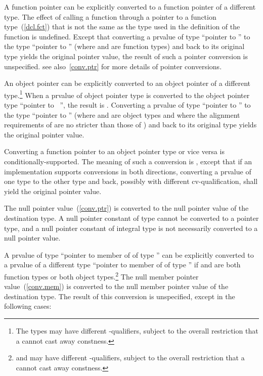 \pnum
{}%
%
%
A function pointer can be explicitly converted
to a function pointer of a different type.
%
The effect of calling a function through a pointer to a function
type~(\ref{dcl.fct}) that is not the same as the type used in the
definition of the function is undefined. Except that converting
a prvalue of type ``pointer to '' to the type ``pointer to
'' (where  and  are function types) and
back to its original type yields the original pointer value, the result
of such a pointer conversion is unspecified.
\enternote 
see also~\ref{conv.ptr} for more details of pointer conversions.
\exitnote 

\pnum
An object pointer
can be explicitly converted to an object pointer of a different type.\footnote{The
types may have different \cv-qualifiers, subject to
the overall
restriction that a  cannot cast away constness.}
When a prvalue  of object pointer type is converted to
the object pointer type ``pointer to \cv\ '', the result is .
Converting a prvalue of type ``pointer to '' to
the type ``pointer to '' (where  and  are
object types and where the alignment requirements of \tcode{T2} are no
stricter than those of \tcode{T1}) and back to its original type yields
the original pointer value.

\pnum
Converting a function pointer to an object pointer
type or vice versa is
conditionally-supported. The meaning of such a conversion is
,
except that if an implementation
supports conversions in both directions, converting a prvalue of one type to the other
type and back, possibly with different cv-qualification, shall yield the original
pointer value.

\pnum
The null pointer value~(\ref{conv.ptr}) is converted to the null pointer value
of the destination type.
\enternote
A null pointer constant of type  cannot be converted to a
pointer type, and a null pointer constant of integral type is not necessarily
converted to a null pointer value.
\exitnote

\pnum
{}%
%
A prvalue of type ``pointer to member of  of type ''
can be explicitly converted to a prvalue of a different type ``pointer to member of
\tcode{Y} of type '' if  and  are both
function types or both object types.\footnote{\tcode{T1} and \tcode{T2} may have
different \cv-qualifiers, subject to
the overall restriction that a  cannot cast away
constness.} The null member pointer value~(\ref{conv.mem}) is converted to the
null member pointer value of the destination type. The result of this
conversion is unspecified, except in the following cases:

